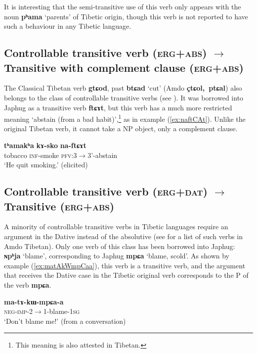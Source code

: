 \documentclass[oneside,a4paper,11pt]{article}
\newcommand{\ipa}[1]{{\phon\textbf{\mbox{#1}}}} %
\newcommand{\refb}[1]{(\ref{#1})}
\begin{document}
It is interesting that the semi-transitive use of this verb only appears with the noun \ipa{pʰama} `parents' of Tibetic origin, though this verb is not reported to have such a behaviour in any Tibetic language.



\subsection{Controllable transitive verb (\textsc{erg+abs})  $\rightarrow$ Transitive with complement clause (\textsc{erg+abs})}
The Classical Tibetan verb \ipa{gtɕod}, past \ipa{btɕad} `cut' (Amdo \ipa{çtɕol, ptɕal}) also belongs to the class of controllable transitive verbs (see \citealt[86, ex. 187]{haller04themchen}). It was borrowed into Japhug as a transitive verb \ipa{ftɕɤt}, but this verb has a much more restricted meaning `abstain (from a bad habit)',\footnote{This meaning is also attested in Tibetan.} as in example \refb{ex:naftCAt}. Unlike the original Tibetan verb, it cannot take a NP object, only a complement clause.

\begin{exe}
\ex \label{ex:naftCAt}
\gll
\ipa{tʰamakʰa} \ipa{kɤ-sko} \ipa{na-ftɕɤt}\\
tobacco \textsc{inf}-smoke \textsc{pfv}:3$\rightarrow$3'-abstain \\
\glt `He quit smoking.' (elicited)
\end{exe}

\subsection{Controllable transitive verb (\textsc{erg+dat})  $\rightarrow$ Transitive (\textsc{erg+abs}) }
A minority of controllable transitive verbs in Tibetic languages require an argument in the Dative instead of the absolutive (see \citealt[111]{haller04themchen} for a list of such verbs in Amdo Tibetan). Only one verb of this class has been borrowed into Japhug: \ipa{ɴpʰja} `blame', corresponding to Japhug \ipa{mpɕa} `blame, scold'. As shown by example \refb{ex:matAkWmpCaa}, this verb is a transitive verb, and the argument that receives the Dative case in the Tibetic original verb corresponds to the P of the verb \ipa{mpɕa}.

\begin{exe}
\ex \label{ex:matAkWmpCaa}
\gll
  \ipa{ma-tɤ-kɯ-mpɕa-a} \\
  \textsc{neg-imp}-2$\rightarrow$1-blame-\textsc{1sg} \\
\glt `Don't blame me!' (from a conversation)
\end{exe}
  
\end{document}
